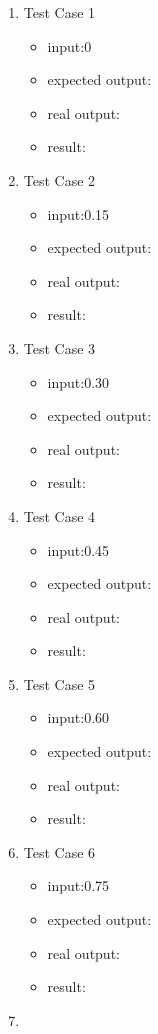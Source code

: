 \documentclass[10pt,a4paper,twoside]{article}
\begin{document}
\begin{enumerate}
\item 
Test Case 1
\begin{itemize}
    \item input:0
    \item expected output:
    \item real output:
    \item result:
\end{itemize}
\item 
Test Case 2
\begin{itemize}
    \item input:0.15
    \item expected output:
    \item real output:
    \item result:
\end{itemize}
\item 
Test Case 3
\begin{itemize}
    \item input:0.30
    \item expected output:
    \item real output:
    \item result:
\end{itemize}
\item 
Test Case 4
\begin{itemize}
    \item input:0.45
    \item expected output:
    \item real output:
    \item result:
\end{itemize}
\item 
Test Case 5
\begin{itemize}
    \item input:0.60
    \item expected output:
    \item real output:
    \item result:
\end{itemize}
\item 
Test Case 6
\begin{itemize}
    \item input:0.75
    \item expected output:
    \item real output:
    \item result:
\end{itemize}
\item 

\end{enumerate}
\end{document}
